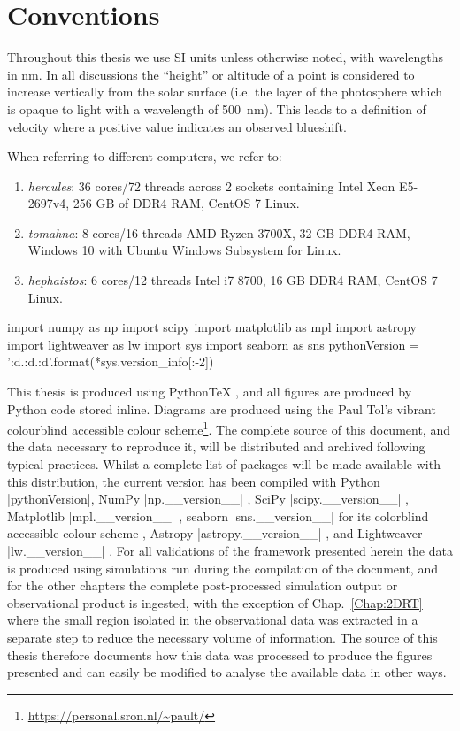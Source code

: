 \section{Conventions}\label{Sec:Conventions}

Throughout this thesis we use SI units unless otherwise noted, with wavelengths in \si{\nano\m}.
In all discussions the ``height'' or altitude of a point is considered to increase vertically from the solar surface (i.e. the layer of the photosphere which is opaque to light with a wavelength of \SI{500}{\nano\m}).
This leads to a definition of velocity where a positive value indicates an observed blueshift.

When referring to different computers, we refer to:
\begin{enumerate}
    \item \emph{hercules}: 36 cores/72 threads across 2 sockets containing Intel Xeon E5-2697v4, 256 GB of DDR4 RAM, CentOS 7 Linux.
    \item \emph{tomahna}: 8 cores/16 threads AMD Ryzen 3700X, 32 GB DDR4 RAM, Windows 10 with Ubuntu Windows Subsystem for Linux.
    \item \emph{hephaistos}: 6 cores/12 threads Intel i7 8700, 16 GB DDR4 RAM, CentOS 7 Linux.
\end{enumerate}

\begin{pycode}[Intro]
import numpy as np
import scipy
import matplotlib as mpl
import astropy
import lightweaver as lw
import sys
import seaborn as sns
pythonVersion = '{:d}.{:d}.{:d}'.format(*sys.version_info[:-2])
\end{pycode}

This thesis is produced using PythonTeX \citep{Poore2015}, and all figures are produced by Python code stored inline.
Diagrams are produced using the Paul Tol's vibrant colourblind accessible colour scheme\footnote{\url{https://personal.sron.nl/~pault/}}.
The complete source of this document, and the data necessary to reproduce it, will be distributed and archived following typical practices.
Whilst a complete list of packages will be made available with this distribution, the current version has been compiled with Python \py[Intro]|pythonVersion|, NumPy \py[Intro]|np.__version__| \citep{Harris2020}, SciPy \py[Intro]|scipy.__version__| \citep{Virtanen2020}, Matplotlib \py[Intro]|mpl.__version__| \citep{Hunter2007}, seaborn \py[Intro]|sns.__version__| for its colorblind accessible colour scheme \citep{Waskom2021}, Astropy \py[Intro]|astropy.__version__| \citep{Robitaille2013,Price-Whelan2018}, and Lightweaver \py[Intro]|lw.__version__| \citep{Osborne2021}.
For all validations of the \Lw{} framework presented herein the data is produced using simulations run during the compilation of the document, and for the other chapters the complete post-processed simulation output or observational product is ingested, with the exception of Chap.~\ref{Chap:2DRT} where the small region isolated in the observational data was extracted in a separate step to reduce the necessary volume of information.
The source of this thesis therefore documents how this data was processed to produce the figures presented and can easily be modified to analyse the available data in other ways.

